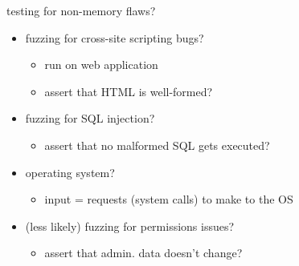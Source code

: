 \begin{frame}{testing for non-memory flaws?}
    \begin{itemize}
    \item fuzzing for cross-site scripting bugs?
        \begin{itemize}
        \item run on web application
        \item assert that HTML is well-formed?
        \end{itemize}
    \item fuzzing for SQL injection?
        \begin{itemize}
        \item assert that no malformed SQL gets executed?
        \end{itemize}
    \item operating system?
        \begin{itemize}
        \item input = requests (system calls) to make to the OS
        \end{itemize}
    \vspace{.5cm}
    \item (less likely) fuzzing for permissions issues?
        \begin{itemize}
        \item assert that admin. data doesn't change?
        \end{itemize}
    \end{itemize}
\end{frame}
